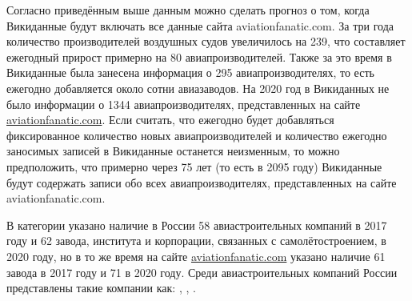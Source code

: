 Согласно приведённым выше данным можно сделать прогноз о том, когда Викиданные будут включать все данные сайта aviationfanatic.com. За три года количество производителей воздушных судов увеличилось на 239, что составляет ежегодный прирост примерно на 80 авиапроизводителей. Также за это время в Викиданные была занесена информация о 295 авиапроизводителях, то есть ежегодно добавляется около сотни авиазаводов. На 2020 год в Викиданных не было информации о \num{1344} авиапроизводителях, представленных на сайте \href{https://www.aviationfanatic.com/}{aviationfanatic.com}. Если считать, что ежегодно будет добавляться фиксированное количество новых авиапроизводителей и количество ежегодно заносимых записей в Викиданные останется неизменным, то можно предположить, что примерно через 75 лет (то есть в 2095 году) Викиданные будут содержать записи обо всех авиапроизводителях, представленных на сайте aviationfanatic.com.


В категории  указано наличие в России 58 авиастроительных компаний в 2017 году и 62 завода, института и корпорации, связанных с самолётостроением, в 2020 году, но в то же время на сайте \href{https://www.aviationfanatic.com/}{aviationfanatic.com} указано наличие 61 завода\cite{count_plants_of_aircrafts} в 2017 году и 71 в 2020 году. Среди авиастроительных компаний России представлены такие компании как: , , .




